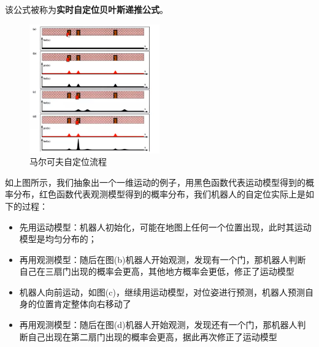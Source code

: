 \documentclass[../main.tex]{subfiles}
\begin{document}
该公式被称为\textbf{实时自定位贝叶斯递推公式}。
            \begin{figure}[H]
                \centering
                \includegraphics[width=0.5\textwidth]{images/markov_example.png}
                \caption{马尔可夫自定位流程}
            \end{figure}
            {\small\kaishu 如上图所示，我们抽象出一个一维运动的例子，用黑色函数代表运动模型得到的概率分布，红色函数代表观测模型得到的概率分布，我们机器人的自定位实际上是如下的过程：
            \begin{itemize}
                \item 先用运动模型：机器人初始化，可能在地图上任何一个位置出现，此时其运动模型是均匀分布的；
                \item 再用观测模型：随后在图(b)机器人开始观测，发现有一个门，那机器人判断自己在三扇门出现的概率会更高，其他地方概率会更低，修正了运动模型
                \item 机器人向前运动，如图(c)，继续用运动模型，对位姿进行预测，机器人预测自身的位置肯定整体向右移动了
                \item 再用观测模型：随后在图(d)机器人开始观测，发现还有一个门，那机器人判断自己出现在第二扇门出现的概率会更高，据此再次修正了运动模型
            \end{itemize}}
            
\end{document}
